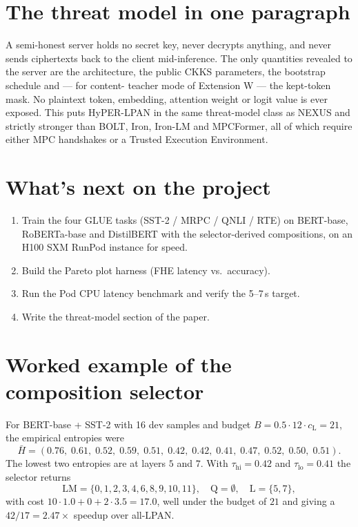 \documentclass[11pt,a4paper]{article}
\newcommand{\hyperlpan}{HyPER-LPAN}
\begin{document}
\section{The threat model in one paragraph}

A semi-honest server holds no secret key, never decrypts anything,
and never sends ciphertexts back to the client mid-inference. The
only quantities revealed to the server are the architecture, the
public CKKS parameters, the bootstrap schedule and — for content-
teacher mode of Extension W — the kept-token mask. No plaintext
token, embedding, attention weight or logit value is ever exposed.
This puts \hyperlpan{} in the same threat-model class as NEXUS and
strictly stronger than BOLT, Iron, Iron-LM and MPCFormer, all of
which require either MPC handshakes or a Trusted Execution
Environment.

\section{What's next on the project}

\begin{enumerate}
    \item Train the four GLUE tasks (SST-2 / MRPC / QNLI / RTE) on
    BERT-base, RoBERTa-base and DistilBERT with the selector-derived
    compositions, on an H100 SXM RunPod instance for speed.
    \item Build the Pareto plot harness (FHE latency vs.\ accuracy).
    \item Run the Pod CPU latency benchmark and verify the 5--7\,s
    target.
    \item Write the threat-model section of the paper.
\end{enumerate}

\appendix
\section{Worked example of the composition selector}

For BERT-base + SST-2 with 16 dev samples and budget
$B = 0.5 \cdot 12 \cdot c_{\text{L}} = 21$, the empirical entropies
were
\[
\bar H = (0.76,\; 0.61,\; 0.52,\; 0.59,\; 0.51,\; 0.42,\; 0.42,\; 0.41,\;
        0.47,\; 0.52,\; 0.50,\; 0.51).
\]
The lowest two entropies are at layers $5$ and $7$. With
$\tau_{\text{hi}} = 0.42$ and $\tau_{\text{lo}} = 0.41$ the selector
returns
\[
\text{LM} = \{0,1,2,3,4,6,8,9,10,11\}, \quad
\text{Q} = \emptyset, \quad
\text{L} = \{5, 7\},
\]
with cost $10 \cdot 1.0 + 0 + 2 \cdot 3.5 = 17.0$, well under the
budget of $21$ and giving a $42 / 17 = 2.47\times$ speedup over
all-LPAN.
\end{document}
